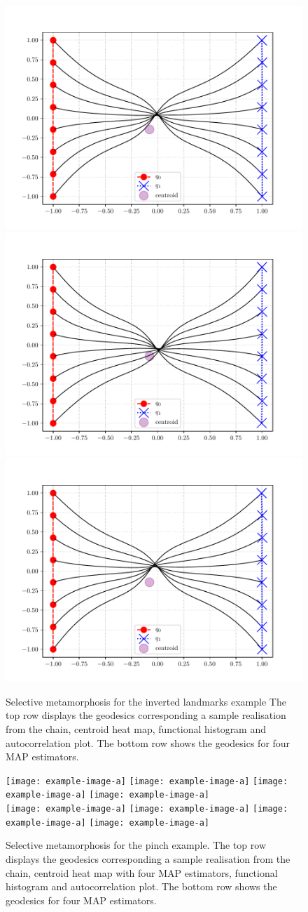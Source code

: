 \documentclass[runningheads]{llncs}
\begin{document}
\begin{figure}
\begin{minipage}{\textwidth}
    \includegraphics[width=.23\textwidth]{../results/results_criss_cross/MAP_center_1.pdf}
    \includegraphics[width=.23\textwidth]{../results/results_criss_cross/MAP_center_2.pdf}
    \includegraphics[width=.23\textwidth]{../results/results_criss_cross/MAP_center_3.pdf}
    \caption{Selective metamorphosis for the inverted landmarks example The top
    row displays the geodesics corresponding a sample realisation from the
    chain, centroid heat map, functional histogram and
    autocorrelation plot. The bottom row shows the geodesics for four MAP
    estimators.}
    \label{fig:selective:crisscross}
\end{minipage}
\end{figure}
\begin{figure}
\centering
\begin{minipage}{\textwidth}
  \centering
    \texttt{[image: example-image-a]}\quad
    \texttt{[image: example-image-a]}\quad
    \texttt{[image: example-image-a]}\quad
    \texttt{[image: example-image-a]}\\[0.25cm]
    \texttt{[image: example-image-a]}\quad
    \texttt{[image: example-image-a]}\quad
    \texttt{[image: example-image-a]}\quad
    \texttt{[image: example-image-a]}
    \caption{Selective metamorphosis for the pinch example. The top row displays
    the geodesics corresponding a sample realisation from the chain, centroid
    heat map with four MAP estimators, functional histogram and autocorrelation
    plot. The bottom row shows the geodesics for four MAP estimators.}
    \label{fig:selective:pinch}
\end{minipage}
\end{figure}
\end{document}
